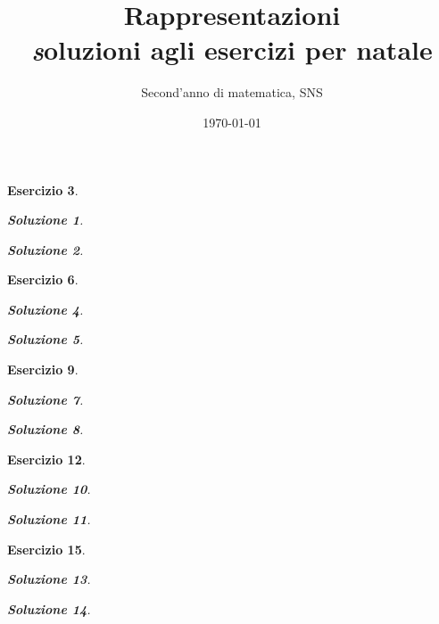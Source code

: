 \documentclass[a4paper]{article}
\title{Rappresentazioni \\ { \textit soluzioni agli esercizi per natale }}
\author{Second'anno di matematica, SNS}
\date{\today}
\theoremstyle{plain}
\newtheorem{ex}{Esercizio}
\newtheorem{sol}[ex]{Soluzione}
\begin{document}
\maketitle

\begin{ex}


\begin{sol}

\end{sol}

\begin{sol}

\end{sol}


\end{ex}

\begin{ex}


\begin{sol}

\end{sol}

\begin{sol}

\end{sol}


\end{ex}

\begin{ex}


\begin{sol}

\end{sol}

\begin{sol}

\end{sol}


\end{ex}

\begin{ex}


\begin{sol}

\end{sol}

\begin{sol}

\end{sol}


\end{ex}

\begin{ex}


\begin{sol}

\end{sol}

\begin{sol}

\end{sol}


\end{ex}
\end{document}
